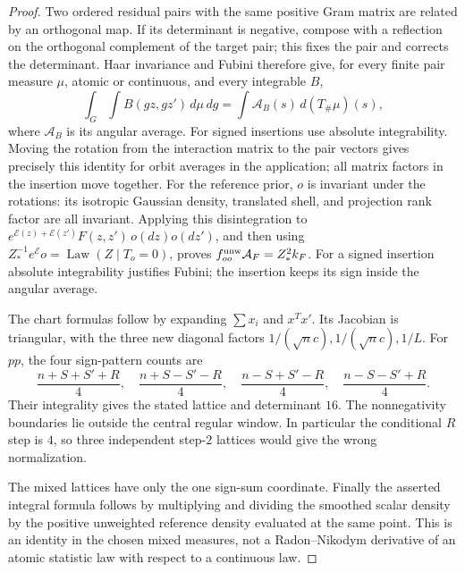 \begin{proof}
Two ordered residual pairs with the same positive Gram matrix
are related by an orthogonal map. If its determinant is negative,
compose with a reflection on the orthogonal complement of the
target pair; this fixes the pair and corrects the determinant.
Haar invariance and Fubini therefore give, for every finite pair
measure $\mu$, atomic or continuous, and every integrable \(B\),
\[
 \int_G\int B(gz,gz')\,d\mu\,dg
   =\int\mathcal A_B(s)\,d(T_\#\mu)(s),
\]
where \(\mathcal A_B\) is its angular average.
For signed insertions use absolute integrability. Moving the
rotation from the interaction matrix to the pair vectors gives
precisely this identity for orbit averages in the application;
all matrix factors in the insertion move together.
For the reference prior, \(o\) is invariant under the rotations:
its isotropic Gaussian density, translated shell, and projection
rank factor are all invariant. Applying this disintegration to
\(e^{\mathcal E(z)+\mathcal E(z')}F(z,z')\,o(dz)o(dz')\),
and then using
\(Z_*^{-1}e^{\mathcal E}o=\operatorname{Law}(Z\mid T_o=0)\),
proves \(f_{oo}^{\rm unw}\mathcal A_F=Z_*^2k_F\).
For a signed insertion absolute integrability justifies Fubini;
the insertion keeps its sign inside the angular average.

The chart formulas follow by expanding $\sum x_i$ and
$x^Tx'$. Its Jacobian is triangular, with the three new diagonal
factors $1/(\sqrt n c),1/(\sqrt n c),1/L$.
For $pp$, the four sign-pattern counts are
\[
 \frac{n+S+S'+R}{4},\quad \frac{n+S-S'-R}{4},\quad
 \frac{n-S+S'-R}{4},\quad \frac{n-S-S'+R}{4}.
\]
Their integrality gives the stated lattice and determinant $16$.
The nonnegativity boundaries lie outside the central regular
window. In particular the conditional $R$ step is $4$, so three
independent step-$2$ lattices would give the wrong normalization.

The mixed lattices have only the one sign-sum coordinate.
Finally the asserted integral formula follows by multiplying and
dividing the smoothed scalar density by the positive unweighted reference
density evaluated at the same point. This is an identity in the
chosen mixed measures, not a Radon--Nikodym derivative of an
atomic statistic law with respect to a continuous law.
\end{proof}

